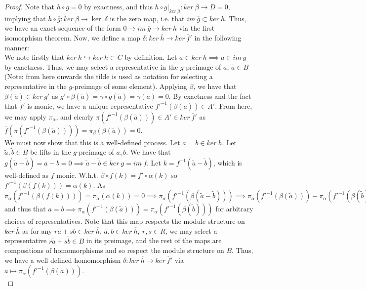 \documentclass{article}
\begin{document}
\begin{proof}
  Note that $h \circ g = 0$ by exactness, and thus $h \circ g|_{ker \ \beta}:ker \ \beta \to D = 0$, implying that $\overline h \circ \overline g: ker \ \beta \to \ker \ \delta$ is the zero map, i.e. that $im \ \overline g \subset ker \ \overline h$. Thus, we have an exact sequence of the form $0 \to im \ \overline g \to ker \ \overline h$ via the first isomorphism theorem. Now, we define a map $\delta: ker \ \overline h \to ker \ \overline f'$ in the following manner: \\
  We note firstly that $ker \ \overline h \hookrightarrow ker \ h \subset C$ by definition. Let $a \in ker \ \overline h \implies a \in im \ g$ by exactness. Thus, we may select a representative in the $g$-preimage of $a$, $\widetilde a \in B$ (Note: from here onwards the tilde is used as notation for selecting a representative in the $g$-preimage of some element). Applying $\beta$, we have that $\beta(\widetilde a) \in ker \ g'$ as $g' \circ \beta(\widetilde a) = \gamma \circ g (\widetilde a) = \gamma(a) = 0$. By exactness and the fact that $f'$ is monic, we have a unique representative $f'^{-1}(\beta(\widetilde a)) \in A'$. From here, we may apply $\pi_{\alpha}$, and clearly $\pi(f'^{-1}(\beta(\widetilde a))) \in A' \in ker \ \overline f'$ as $\overline f(\pi(f'^{-1}(\beta(\widetilde a)))) = \pi_{\beta}(\beta(\widetilde a)) = 0$.  \\

  We must now show that this is a well-defined process. Let $a = b \in ker \ \overline h$. Let $\widetilde a, \widetilde b \in B$ be lifts in the $g$-preimage of $a, b$. We have that $g(\widetilde a - \widetilde b) = a - b = 0 \implies  \widetilde a - \widetilde b \in ker \ g = im \ f$. Let $k = f^{-1}(\widetilde a - \widetilde b)$, which is well-defined as $f$ monic. W.h.t. $\beta \circ f(k) = f' \circ \alpha(k)$ so $f'^{-1}(\beta (f(k))) = \alpha(k)$. As $\pi_{\alpha}(f'^{-1}(\beta (f(k)))) = \pi_{\alpha}(\alpha(k)) = 0 \implies \pi_{\alpha}(f'^{-1}(\beta (\widetilde a - \widetilde b))) \implies \pi_{\alpha}(f'^{-1}(\beta (\widetilde a))) - \pi_{\alpha}(f'^{-1}(\beta (\widetilde b))) = 0$ and thus that $a=b \implies \pi_{\alpha}(f'^{-1}(\beta (\widetilde a))) = \pi_{\alpha}(f'^{-1}(\beta (\widetilde b)))$ for arbitrary choices of representatives. Note that this map respects the module structure on $ker \ \overline h$ as for any $ra + sb \in ker \ \overline h$, $a,b \in ker \ \overline h, \ r,s \in R$, we may select a representative $r \widetilde a + s \widetilde b \in B$ in its preimage, and the rest of the maps are compositions of homomorphisms and so respect the module structure on $B$. Thus, we have a well defined homomorphism $\delta: ker \ \overline h \to ker \ \overline f'$ via $a \mapsto \pi_{\alpha}(f'^{-1}(\beta (\widetilde a)))$. \\


\end{proof}
\end{document}
